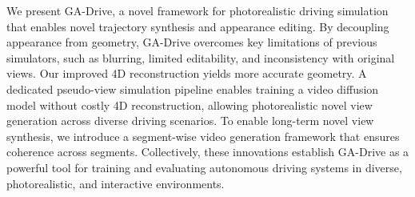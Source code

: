 
We present GA-Drive, a novel framework for photorealistic driving simulation that enables novel trajectory synthesis and appearance editing. By decoupling appearance from geometry, GA-Drive overcomes key limitations of previous simulators, such as blurring, limited editability, and inconsistency with original views. Our improved 4D reconstruction yields more accurate geometry. A dedicated pseudo-view simulation pipeline enables training a video diffusion model without costly 4D reconstruction, allowing photorealistic novel view generation across diverse driving scenarios. To enable long-term novel view synthesis, we introduce a segment-wise video generation framework that ensures coherence across segments. Collectively, these innovations establish GA-Drive as a powerful tool for training and evaluating autonomous driving systems in diverse, photorealistic, and interactive environments.



